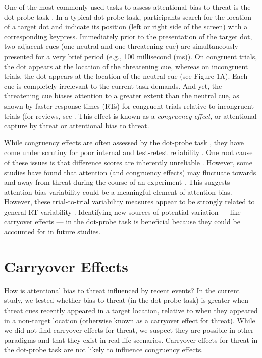 \documentclass[issue,header,twocolumn,empirical, authordate,10pt]{jote-new-article}
\begin{document}
One of the most commonly used tasks to assess attentional bias to threat is the dot-probe task \parencite{MacLeod1986}. In a typical dot-probe task, participants search for the location of a target dot and indicate its position (left or right side of the screen) with a corresponding keypress. Immediately prior to the presentation of the target dot, two adjacent cues (one neutral and one threatening cue) are simultaneously presented for a very brief period (e.g., 100 millisecond (ms)). On congruent trials, the dot appears at the location of the threatening cue, whereas on incongruent trials, the dot appears at the location of the neutral cue (see Figure 1A). Each cue is completely irrelevant to the current task demands. And yet, the threatening cue biases attention to a greater extent than the neutral cue, as shown by faster response times (RTs) for congruent trials relative to incongruent trials (for reviews, see \parencite{Carretié2014, Imhoff2019}. This effect is known as a \emph{congruency effect}, or attentional capture by threat or attentional bias to threat.

While congruency effects are often assessed by the dot-probe task \parencite{Kruijt2018, Mogg2017}, they have come under scrutiny for poor internal and test-retest reliability \parencite{Schmukle2005, Staugaard2009}. One root cause of these issues is that difference scores are inherently unreliable \parencite[for an explanation, see][]{Hedge2018}. However, some studies have found that attention (and congruency effects) may fluctuate towards and away from threat during the course of an experiment \parencite{Zvielli2015}. This suggests attention bias variability could be a meaningful element of attention bias. However, these trial-to-trial variability measures appear to be strongly related to general RT variability \parencite{Carlson2020, Kruijt2016}. Identifying new sources of potential variation — like carryover effects — in the dot-probe task is beneficial because they could be accounted for in future studies.


\FloatBarrier

\section{Carryover Effects}

\begin{takehomemessage}

How is attentional bias to threat influenced by recent events? In the current study, we tested whether bias to threat (in the dot-probe task) is greater when threat cues recently appeared in a target location, relative to when they appeared in a non-target location (otherwise known as a carryover effect for threat). While we did not find carryover effects for threat, we suspect they are possible in other paradigms and that they exist in real-life scenarios. Carryover effects for threat in the dot-probe task are not likely to influence congruency effects.


\end{takehomemessage}
\end{document}
